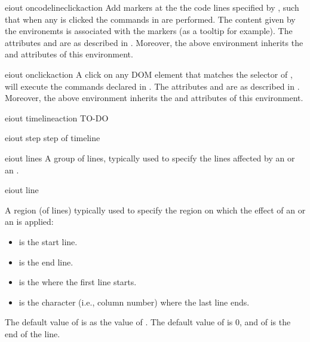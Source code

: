 \bigskip
\xmlstruct
{eiout}
{oncodelineclickaction}
{%
%
  Add markers at the the code lines specified by ,
  such that when any is clicked the commands in
   are performed.
  The content given by the  environemts is
  associated with the markers (as a tooltip for example).
%
  The attributes  and  are
  as described in . Moreover, the above
   environment inherits the
   and  attributes of this
  environment.
%
}


\bigskip
\xmlstruct
{eiout}
{onclickaction}
{%
%
  A click on any DOM element that matches the selector of
  , will execute the commands declared in
  .
%
  The attributes  and  are
  as described in . Moreover, the above
   environment inherits the
   and  attributes of this
  environment.
%
}


\bigskip
\xmlstruct
{eiout}
{timelineaction}
{%
%
  TO-DO
%
}

\bigskip
\xmlstruct
{eiout}
{step}
{%
step of timeline
}


\bigskip
\xmlstruct
{eiout}
{lines}
{
A group of lines, typically used to specify the lines affected by 
an  or an .
}


\bigskip
\xmlstruct
{eiout}
{line}
{%
%
  A region (of lines) typically used to specify the region on which
  the effect of an  or an
   is applied:
%
\begin{itemize}
\item {} is the start line.
\item {} is the end line.
\item {} is the  where the first line starts.
\item {} is the character (i.e., column number) where the last line ends.
\end{itemize}
%
The default value of  is as the value of
. The default value of  is
0, and of  is the end of the line.
%
}

